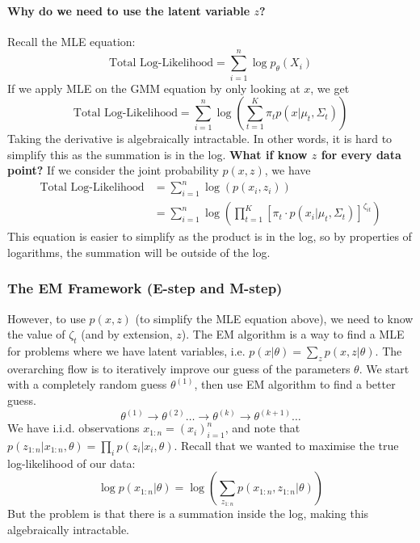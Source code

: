 \documentclass[../Probability.tex]{subfiles}
\begin{document}
\paragraph{Why do we need to use the latent variable $z$?} Recall the MLE equation:
$$\text{Total Log-Likelihood} = \sum_{i=1}^{n} \log p_{\theta}(X_i)$$
If we apply MLE on the GMM equation by only looking at $x$, we get
$$\text{Total Log-Likelihood} = \sum_{i=1}^{n} \log \left( \sum_{t=1}^{K} \pi_t p(x|\mu_t, \Sigma_t) \right)$$
Taking the derivative is algebraically intractable. In other words, it is hard to simplify this as the summation is in the log.\newline
\textbf{What if know $z$ for every data point?}\newline
If we consider the joint probability $p(x, z)$, we have
\begin{align*}
    \text{Total Log-Likelihood} &= \sum_{i=1}^n \log (p(x_i, z_i)) \\
    &= \sum_{i=1}^n \log \left( \prod_{t=1}^K \left[ \pi_t \cdot p(x_i | \mu_t, \Sigma_t) \right]^{\zeta_{it}} \right)
\end{align*}
This equation is easier to simplify as the product is in the log, so by properties of logarithms, the summation will be outside of the log.\newline

\subsubsection{The EM Framework (E-step and M-step)}
However, to use $p(x, z)$ (to simplify the MLE equation above), we need to know the value of $\zeta_t$ (and by extension, $z$).\newline
The EM algorithm is a way to find a MLE for problems where we have latent variables, i.e. $p(x|\theta) = \sum_z p(x,z|\theta)$.\newline
The overarching flow is to iteratively improve our guess of the parameters $\theta$. We start with a completely random guess $\theta^{(1)}$, then use EM algorithm to find a better guess.
$$\theta^{(1)} \rightarrow \theta^{(2)} \dots \rightarrow \theta^{(k)} \rightarrow \theta^{(k+1)} \dots$$
We have i.i.d. observations $x_{1:n} = (x_i)^n_{i=1}$, and note that $p(z_{1:n}|x_{1:n},\theta) = \prod_i p(z_i|x_i,\theta)$.\newline
Recall that we wanted to maximise the true log-likelihood of our data:
$$\log p(x_{1:n}|\theta) = \log \left( \sum_{z_{1:n}} p(x_{1:n}, z_{1:n}|\theta) \right)$$
But the problem is that there is a summation inside the log, making this algebraically intractable.
\end{document}
